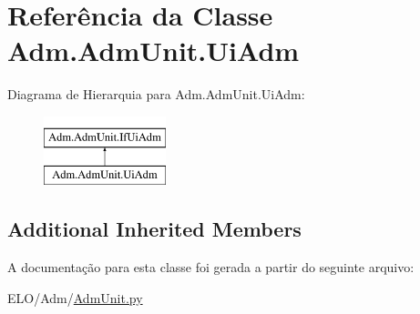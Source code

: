 \hypertarget{classAdm_1_1AdmUnit_1_1UiAdm}{\section{Referência da Classe Adm.\-Adm\-Unit.\-Ui\-Adm}
\label{d4/dde/classAdm_1_1AdmUnit_1_1UiAdm}
}
Diagrama de Hierarquia para Adm.\-Adm\-Unit.\-Ui\-Adm\-:\begin{figure}[H]
\begin{center}
\leavevmode
\includegraphics[height=2.000000cm]{d4/dde/classAdm_1_1AdmUnit_1_1UiAdm}
\end{center}
\end{figure}
\subsection*{Additional Inherited Members}


A documentação para esta classe foi gerada a partir do seguinte arquivo\-:\begin{DoxyCompactItemize}
\item 
E\-L\-O/\-Adm/\hyperlink{AdmUnit_8py}{Adm\-Unit.\-py}\end{DoxyCompactItemize}
